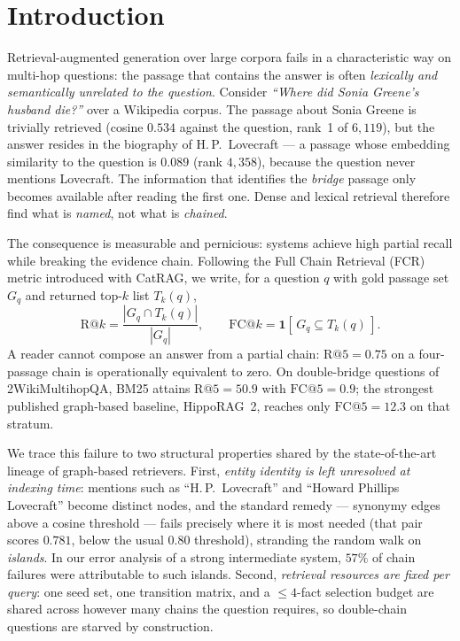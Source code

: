 \documentclass[11pt,a4paper]{article}
\newcommand{\hippo}{HippoRAG~2}
\begin{document}
\section{Introduction}
\label{sec:intro}

Retrieval-augmented generation over large corpora fails in a characteristic
way on multi-hop questions: the passage that contains the answer is often
\emph{lexically and semantically unrelated to the question}. Consider
\emph{``Where did Sonia Greene's husband die?''} over a Wikipedia corpus. The
passage about Sonia Greene is trivially retrieved (cosine $0.534$ against the
question, rank~1 of $6{,}119$), but the answer resides in the biography of
H.\,P.~Lovecraft --- a passage whose embedding similarity to the question is
$0.089$ (rank $4{,}358$), because the question never mentions Lovecraft. The
information that identifies the \emph{bridge} passage only becomes available
after reading the first one. Dense and lexical retrieval therefore find what
is \emph{named}, not what is \emph{chained}.

The consequence is measurable and pernicious: systems achieve high partial
recall while breaking the evidence chain. Following the Full Chain Retrieval
(FCR) metric introduced with CatRAG, we write, for a question $q$ with gold
passage set $G_q$ and returned top-$k$ list $T_k(q)$,
\begin{equation}
\mathrm{R@}k=\frac{|G_q\cap T_k(q)|}{|G_q|},
\qquad
\mathrm{FC@}k=\mathbf 1\!\left[\,G_q\subseteq T_k(q)\,\right].
\label{eq:metrics}
\end{equation}
A reader cannot compose an answer from a partial chain: $\mathrm{R@}5=0.75$
on a four-passage chain is operationally equivalent to zero. On double-bridge
questions of 2WikiMultihopQA, BM25 attains $\mathrm{R@}5=50.9$ with
$\mathrm{FC@}5=0.9$; the strongest published graph-based baseline, \hippo{},
reaches only $\mathrm{FC@}5=12.3$ on that stratum.

We trace this failure to two structural properties shared by the
state-of-the-art lineage of graph-based retrievers. First, \emph{entity
identity is left unresolved at indexing time}: mentions such as
``H.\,P.~Lovecraft'' and ``Howard Phillips Lovecraft'' become distinct nodes,
and the standard remedy --- synonymy edges above a cosine threshold ---
fails precisely where it is most needed (that pair scores $0.781$, below the
usual $0.80$ threshold), stranding the random walk on \emph{islands}. In our
error analysis of a strong intermediate system, $57\%$ of chain failures were
attributable to such islands. Second, \emph{retrieval resources are fixed per
query}: one seed set, one transition matrix, and a $\le\!4$-fact selection
budget are shared across however many chains the question requires, so
double-chain questions are starved by construction.
\end{document}
